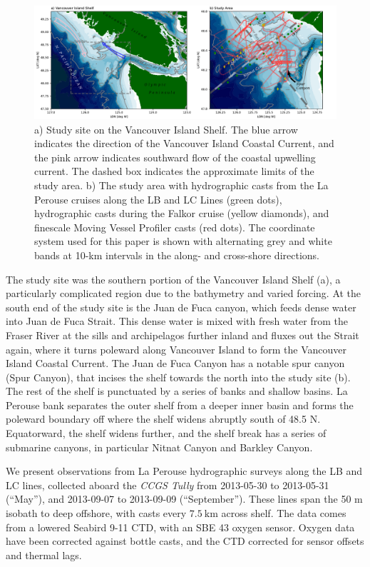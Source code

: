 \documentclass[draft]{agujournal2019}
\begin{document}
\begin{figure}[htbp]
  \includegraphics[width=5in]{LocMapBoth.pdf}
  \caption{a) Study site on the Vancouver Island Shelf.  The blue arrow indicates the direction of the Vancouver Island Coastal Current, and the pink arrow indicates southward flow of the coastal upwelling current.  The dashed box indicates the approximate limits of the study area.  b) The study area with hydrographic casts from the La Perouse cruises along the LB and LC Lines (green dots), hydrographic casts during the Falkor cruise (yellow diamonds), and finescale Moving Vessel Profiler casts (red dots).  The coordinate system used for this paper is shown with alternating grey and white bands at 10-km intervals in the along- and cross-shore directions.}
  \label{fig:LocMapBoth}
\end{figure}

The study site was the southern portion of the Vancouver Island Shelf (a), a particularly complicated region due to the bathymetry and varied forcing.  At the south end of the study site is the Juan de Fuca canyon, which feeds dense water into Juan de Fuca Strait.  This dense water is mixed with fresh water from the Fraser River at the sills and archipelagos further inland and fluxes out the Strait again, where it turns poleward along Vancouver Island to form the Vancouver Island Coastal Current.  The Juan de Fuca Canyon has a notable spur canyon (Spur Canyon), that incises the shelf towards the north into the study site (b).  The rest of the shelf is punctuated by a series of banks and shallow basins.  La Perouse bank  separates the outer shelf from a deeper inner basin and forms the poleward boundary off where the shelf widens abruptly south of 48.5 N. Equatorward, the shelf widens further, and the shelf break has a series of submarine canyons, in particular Nitnat Canyon and Barkley Canyon.

We present observations from La Perouse hydrographic surveys along the LB and LC lines, collected aboard the \emph{CCGS Tully} from 2013-05-30 to 2013-05-31  (``May''), and 2013-09-07 to 2013-09-09 (``September'').  These lines span the 50 m isobath to deep offshore, with casts every $7.5\ \mathrm{km}$ across shelf. The data comes from a lowered Seabird 9-11 CTD, with an SBE 43 oxygen sensor.  Oxygen data have been corrected against bottle casts, and the CTD corrected for sensor offsets and thermal lags.
\end{document}
